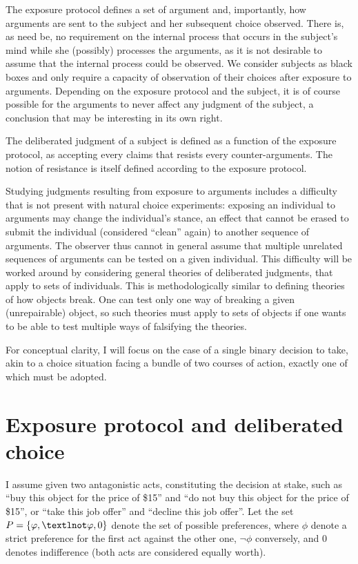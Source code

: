 \documentclass[version=last, pagesize, twoside=off, bibliography=totoc, DIV=calc, fontsize=12pt, a4paper, french, english]{scrartcl}
\begin{document}
The exposure protocol defines a set of argument and, importantly, how arguments are sent to the subject and her subsequent choice observed. There is, as need be, no requirement on the internal process that occurs in the subject’s mind while she (possibly) processes the arguments, as it is not desirable to assume that the internal process could be observed. We consider subjects as black boxes and only require a capacity of observation of their choices after exposure to arguments. Depending on the exposure protocol and the subject, it is of course possible for the arguments to never affect any judgment of the subject, a conclusion that may be interesting in its own right.

The deliberated judgment of a subject is defined as a function of the exposure protocol, as accepting every claims that resists every counter-arguments. The notion of resistance is itself defined according to the exposure protocol.

Studying judgments resulting from exposure to arguments includes a difficulty that is not present with natural choice experiments: exposing an individual to arguments may change the individual’s stance, an effect that cannot be erased to submit the individual (considered “clean” again) to another sequence of arguments. The observer thus cannot in general assume that multiple unrelated sequences of arguments can be tested on a given individual. This difficulty will be worked around by considering general theories of deliberated judgments, that apply to sets of individuals. This is methodologically similar to defining theories of how objects break. One can test only one way of breaking a given (unrepairable) object, so such theories must apply to sets of objects if one wants to be able to test multiple ways of falsifying the theories.

For conceptual clarity, I will focus on the case of a single binary decision to take, akin to a choice situation facing a bundle of two courses of action, exactly one of which must be adopted.

\section{Exposure protocol and deliberated choice}
I assume given two antagonistic acts, constituting the decision at stake, such as “buy this object for the price of \$15” and “do not buy this object for the price of \$15”, or “take this job offer” and “decline this job offer”.
Let the set $P = \set{\phi, ¬\phi, 0}$ denote the set of possible preferences, where $\phi$ denote a strict preference for the first act against the other one, $¬\phi$ conversely, and $0$ denotes indifference (both acts are considered equally worth).
\end{document}
